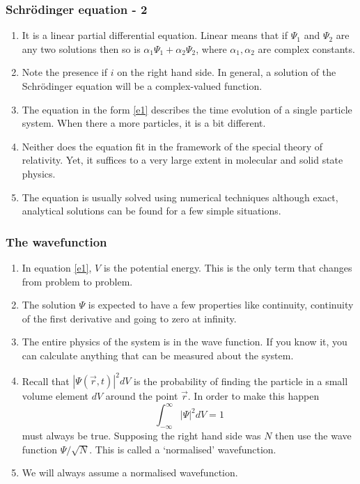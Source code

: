 \documentclass{beamer}
\begin{document}
\begin{frame}
\frametitle{Schr\"{o}dinger equation - 2}
\begin{enumerate}
\item It is a linear partial differential equation. Linear means that if 
$\Psi_1$ and $\Psi_2$ are any two solutions then so is $\alpha_1\Psi_1 + 
\alpha_2\Psi_2$, where $\alpha_1, \alpha_2$ are complex constants.
\item Note the presence if $i$ on the right hand side. In general, a solution
of the Schr\"{o}dinger equation will be a complex-valued function.
\item The equation in the form \eqref{e1} describes the time evolution of a 
single particle system. When there a more particles, it is a bit different.
\item Neither does the equation fit in the framework of the special theory of
relativity. Yet, it suffices to a very large extent in molecular and solid
state physics.
\item The equation is usually solved using numerical techniques although exact, 
analytical solutions can be found for a few simple situations.
\end{enumerate}
\end{frame}

\begin{frame}
\frametitle{The wavefunction}
\begin{enumerate}
\item In equation \eqref{e1}, $V$ is the potential energy. This is the only term
that changes from problem to problem.
\item The solution $\Psi$ is expected to have a few properties like continuity,
continuity of the first derivative and going to zero at infinity.
\item The entire physics of the system is in the wave function. If you know it,
you can calculate anything that can be measured about the system.
\item Recall that $|\Psi(\vec{r}, t)|^2dV$ is the probability of finding the
particle in a small volume element $dV$ around the point $\vec{r}$. In order
to make this happen
\begin{equation}\label{e3}
\int_{-\infty}^\infty |\Psi|^2dV = 1
\end{equation}
must always be true. Supposing the right hand side was $N$ then use the wave
function $\Psi/\sqrt{N}$. This is called a `normalised' wavefunction.
\item We will always assume a normalised wavefunction.
\end{enumerate}
\end{frame}
\end{document}
